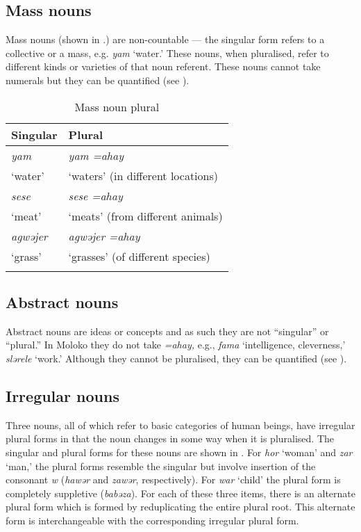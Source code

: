 \subsection{Mass nouns}\label{sec:4.2.4}
\hypertarget{RefHeading1211461525720847}{}
Mass nouns (shown in .) are non-countable --- the singular form refers to a collective or a mass, e.g. \textit{yam} ‘water.’  These nouns, when pluralised, refer to different kinds or varieties of that noun referent. These nouns cannot take numerals but they can be quantified (see ). 

\begin{table}
\begin{tabular}{ll}
\lsptoprule
{Singular} & {Plural}\\\midrule
\textit{yam}  & \textit{yam =ahay} \\
‘water’ &  ‘waters’ (in different locations)\\
\textit{sese}  & \textit{sese =ahay} \\
‘meat’ & ‘meats’ (from different animals)\\
\textit{agwəjer}  & \textit{agwəjer =ahay} \\
‘grass’ & ‘grasses’ (of different species)\\
\lspbottomrule
\end{tabular}
\caption{Mass noun plural}\label{tab:30}
\end{table}

\subsection{Abstract nouns}\label{sec:4.2.5}
\hypertarget{RefHeading1211481525720847}{}
Abstract nouns are ideas or concepts and as such they are not ``singular'' or ``plural.'' In Moloko they do not take \textit{=ahay}\textit{,} e.g., \textit{fama} ‘intelligence, cleverness,’ \textit{slərele} ‘work.’ Although they cannot be pluralised, they can be quantified (see ). 

\subsection{Irregular nouns}\label{sec:4.2.6}
\hypertarget{RefHeading1211501525720847}{}
Three nouns, all of which refer to basic categories of human beings, have irregular plural forms in that the noun changes in some way when it is pluralised. The singular and plural forms for these nouns are shown in . For \textit{hor} ‘woman’ and \textit{zar} ‘man,’ the plural forms resemble the singular but involve insertion of the consonant \textit{w} (\textit{hawər} and \textit{zawər}, respectively). For \textit{war} ‘child’ the plural form is completely suppletive (\textit{babəza}). For each of these three items, there is an alternate plural form which is formed by reduplicating the entire plural root. This alternate form is interchangeable with the corresponding irregular plural form.

